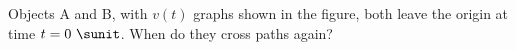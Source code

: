 %
Objects A and B, with $v(t)$ graphs shown in the figure, both leave
the origin at time $t = 0\ \sunit$. When do they cross paths again?\answercheck
